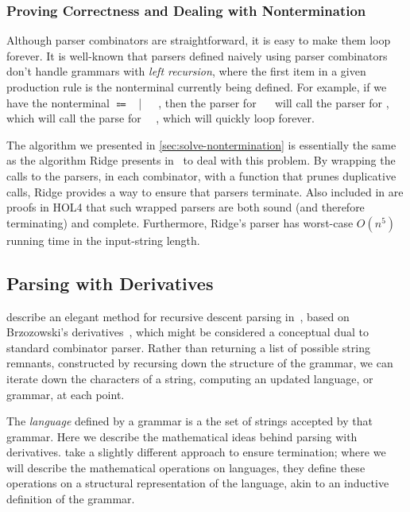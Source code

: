     \subsubsection{Proving Correctness and Dealing with Nontermination}
      Although parser combinators are straightforward, it is easy to make them loop forever.  It is well-known that parsers defined naively using parser combinators don't handle grammars with \emph{left recursion}, where the first item in a given production rule is the nonterminal currently being defined.  For example, if we have the nonterminal  $\Coloneqq$ ~|~~\terminal{+}~, then the parser for ~\terminal{+}~ will call the parser for , which will call the parse for ~\terminal{+}~, which will quickly loop forever.
      
      The algorithm we presented in \autoref{sec:solve-nontermination} is essentially the same as the algorithm Ridge presents in~\cite{Ridge} to deal with this problem.  By wrapping the calls to the parsers, in each combinator, with a function that prunes duplicative calls, Ridge provides a way to ensure that parsers terminate.  Also included in \cite{Ridge} are proofs in HOL4 that such wrapped parsers are both sound (and therefore terminating) and complete.  Furthermore, Ridge's parser has worst-case $O(n^5)$ running time in the input-string length.

  \subsection{Parsing with Derivatives}
     describe an elegant method for recursive descent parsing in~\cite{Derivs}, based on Brzozowski's derivatives~\cite{BrzozowskiDerivs}, which might be considered a conceptual dual to standard combinator parser.  Rather than returning a list of possible string remnants, constructed by recursing down the structure of the grammar, we can iterate down the characters of a string, computing an updated language, or grammar, at each point.
    
    The \emph{language} defined by a grammar is a the set of strings accepted by that grammar.  Here we describe the mathematical ideas behind parsing with derivatives.  \citeauthor*{Derivs} take a slightly different approach to ensure termination; where we will describe the mathematical operations on languages, they define these operations on a structural representation of the language, akin to an inductive definition of the grammar.
    
